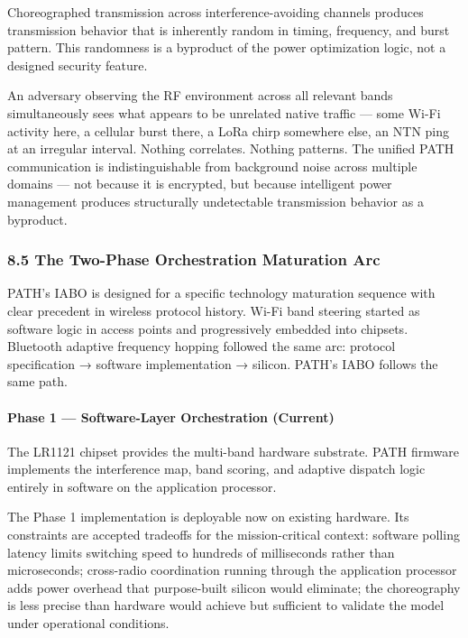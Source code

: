 \documentclass[
  11pt,
]{article}
\begin{document}
Choreographed transmission across interference-avoiding channels
produces transmission behavior that is inherently random in timing,
frequency, and burst pattern. This randomness is a byproduct of the
power optimization logic, not a designed security feature.

An adversary observing the RF environment across all relevant bands
simultaneously sees what appears to be unrelated native traffic --- some
Wi-Fi activity here, a cellular burst there, a LoRa chirp somewhere
else, an NTN ping at an irregular interval. Nothing correlates. Nothing
patterns. The unified PATH communication is indistinguishable from
background noise across multiple domains --- not because it is
encrypted, but because intelligent power management produces
structurally undetectable transmission behavior as a byproduct.

\hypertarget{the-two-phase-orchestration-maturation-arc}{%
\subsubsection{8.5 The Two-Phase Orchestration Maturation
Arc}\label{the-two-phase-orchestration-maturation-arc}}

PATH's IABO is designed for a specific technology maturation sequence
with clear precedent in wireless protocol history. Wi-Fi band steering
started as software logic in access points and progressively embedded
into chipsets. Bluetooth adaptive frequency hopping followed the same
arc: protocol specification → software implementation → silicon. PATH's
IABO follows the same path.

\hypertarget{phase-1-software-layer-orchestration-current}{%
\paragraph{Phase 1 --- Software-Layer Orchestration
(Current)}\label{phase-1-software-layer-orchestration-current}}

The LR1121 chipset provides the multi-band hardware substrate. PATH
firmware implements the interference map, band scoring, and adaptive
dispatch logic entirely in software on the application processor.

The Phase 1 implementation is deployable now on existing hardware. Its
constraints are accepted tradeoffs for the mission-critical context:
software polling latency limits switching speed to hundreds of
milliseconds rather than microseconds; cross-radio coordination running
through the application processor adds power overhead that purpose-built
silicon would eliminate; the choreography is less precise than hardware
would achieve but sufficient to validate the model under operational
conditions.
\end{document}
